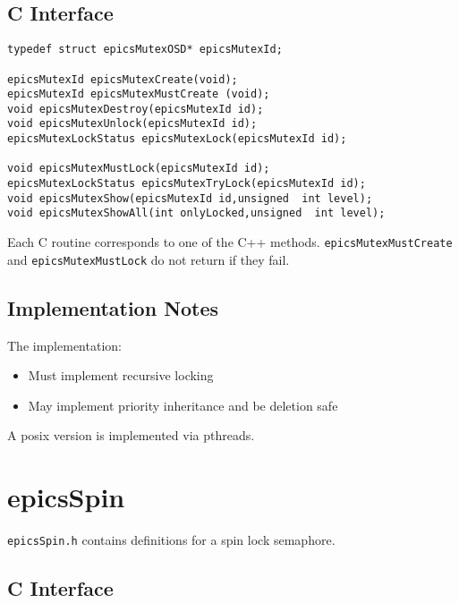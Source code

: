 \subsection{C Interface}

\begin{verbatim}
typedef struct epicsMutexOSD* epicsMutexId;

epicsMutexId epicsMutexCreate(void);
epicsMutexId epicsMutexMustCreate (void);
void epicsMutexDestroy(epicsMutexId id);
void epicsMutexUnlock(epicsMutexId id);
epicsMutexLockStatus epicsMutexLock(epicsMutexId id);

void epicsMutexMustLock(epicsMutexId id);
epicsMutexLockStatus epicsMutexTryLock(epicsMutexId id);
void epicsMutexShow(epicsMutexId id,unsigned  int level);
void epicsMutexShowAll(int onlyLocked,unsigned  int level);
\end{verbatim}

Each C routine corresponds to one of the C++ methods. \verb|epicsMutexMustCreate| and \verb|epicsMutexMustLock| do 
not return if they fail.

\subsection{Implementation Notes}

The implementation:

\begin{itemize}
\item Must implement recursive locking

\item May implement priority inheritance and be deletion safe

\end{itemize}

A posix version is implemented via pthreads.


\section{epicsSpin}

\verb|epicsSpin.h| contains definitions for a spin lock semaphore.

\subsection{C Interface}

